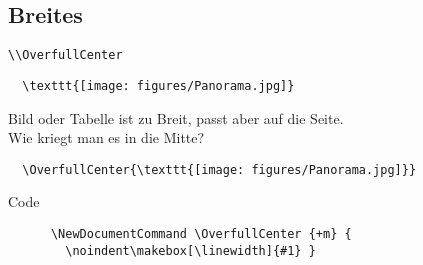 \subsection{Breites}

\begin{frame}[fragile]{\lstinline[texcsstyle=*\color{white}]+\\OverfullCenter+}
  \begin{lstlisting}
  \texttt{[image: figures/Panorama.jpg]}
  \end{lstlisting}

  \vspace{5pt}

  Bild oder Tabelle ist zu Breit, passt aber auf die Seite.\\
  Wie kriegt man es in die Mitte?

  \vspace{5pt}
  \begin{lstlisting}
  \OverfullCenter{\texttt{[image: figures/Panorama.jpg]}}
  \end{lstlisting}


  \begin{block}{Code}
    \begin{lstlisting}
      \NewDocumentCommand \OverfullCenter {+m} {
        \noindent\makebox[\linewidth]{#1} }
    \end{lstlisting}
  \end{block}
\end{frame}

